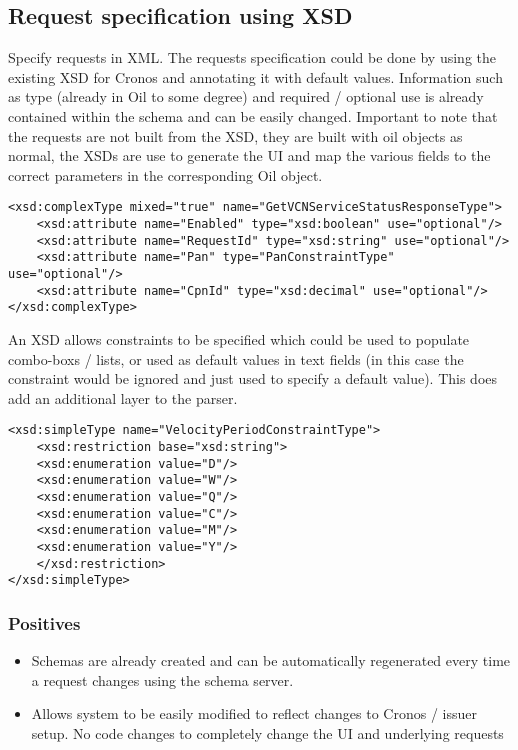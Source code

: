 \documentclass[a4paper, 11pt, titlepage]{article}
\begin{document}
	\subsection{Request specification using XSD}
	Specify requests in XML. The requests specification could be done by using the existing XSD for Cronos and annotating it with default values. Information such as type (already in Oil to some degree) and required / optional use is already contained within the schema and can be easily changed. Important to note that the requests are not built from the XSD, they are built with oil objects as normal, the XSDs are use to generate the UI and map the various fields to the correct parameters in the corresponding Oil object.
	\begin{verbatim}
<xsd:complexType mixed="true" name="GetVCNServiceStatusResponseType">
    <xsd:attribute name="Enabled" type="xsd:boolean" use="optional"/>
    <xsd:attribute name="RequestId" type="xsd:string" use="optional"/>
    <xsd:attribute name="Pan" type="PanConstraintType" use="optional"/>
    <xsd:attribute name="CpnId" type="xsd:decimal" use="optional"/>
</xsd:complexType>
	\end{verbatim}
	An XSD allows constraints to be specified which could be used to populate combo-boxs / lists, or used as default values in text fields (in this case the constraint would be ignored and just used to specify a default value). This does add an additional layer to the parser.
	\begin{verbatim}
<xsd:simpleType name="VelocityPeriodConstraintType">
    <xsd:restriction base="xsd:string">
    <xsd:enumeration value="D"/>
    <xsd:enumeration value="W"/>
    <xsd:enumeration value="Q"/>
    <xsd:enumeration value="C"/>
    <xsd:enumeration value="M"/>
    <xsd:enumeration value="Y"/>
    </xsd:restriction>
</xsd:simpleType>
	\end{verbatim}
		\subsubsection{Positives}
		\begin{itemize}
		\item Schemas are already created and can be automatically regenerated every time a request changes using the schema server.
		\item Allows system to be easily modified to reflect changes to Cronos / issuer setup. No code changes to completely change the UI and underlying requests
		\end{itemize}
\end{document}
